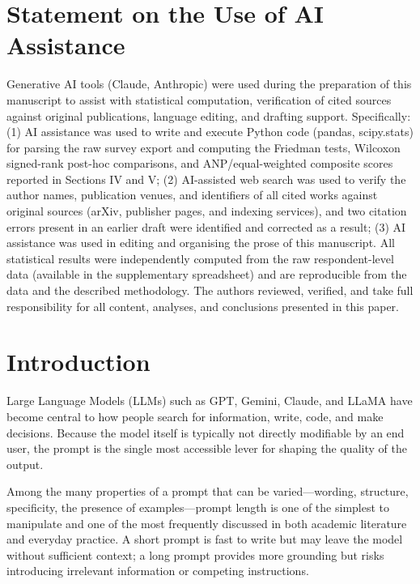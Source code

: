 \documentclass[conference]{IEEEtran}
\begin{document}
\section*{Statement on the Use of AI Assistance}
Generative AI tools (Claude, Anthropic) were used during the preparation of this manuscript to assist with statistical computation, verification of cited sources against original publications, language editing, and drafting support. Specifically: (1) AI assistance was used to write and execute Python code (pandas, scipy.stats) for parsing the raw survey export and computing the Friedman tests, Wilcoxon signed-rank post-hoc comparisons, and ANP/equal-weighted composite scores reported in Sections IV and V; (2) AI-assisted web search was used to verify the author names, publication venues, and identifiers of all cited works against original sources (arXiv, publisher pages, and indexing services), and two citation errors present in an earlier draft were identified and corrected as a result; (3) AI assistance was used in editing and organising the prose of this manuscript. All statistical results were independently computed from the raw respondent-level data (available in the supplementary spreadsheet) and are reproducible from the data and the described methodology. The authors reviewed, verified, and take full responsibility for all content, analyses, and conclusions presented in this paper.

\section{Introduction}
Large Language Models (LLMs) such as GPT, Gemini, Claude, and LLaMA have become central to how people search for information, write, code, and make decisions. Because the model itself is typically not directly modifiable by an end user, the prompt is the single most accessible lever for shaping the quality of the output.

Among the many properties of a prompt that can be varied---wording, structure, specificity, the presence of examples---prompt length is one of the simplest to manipulate and one of the most frequently discussed in both academic literature and everyday practice. A short prompt is fast to write but may leave the model without sufficient context; a long prompt provides more grounding but risks introducing irrelevant information or competing instructions.
\end{document}
